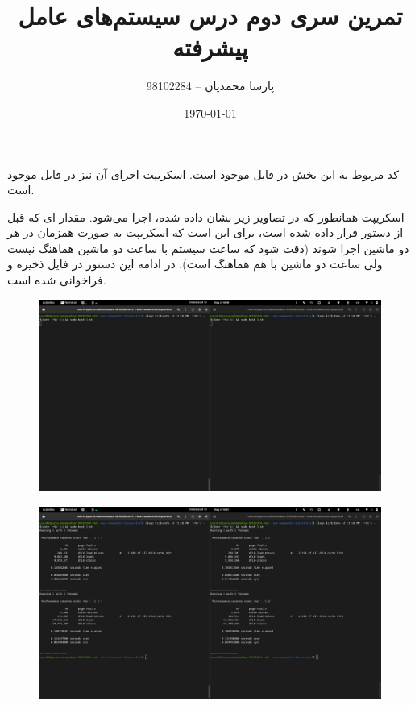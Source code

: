 \documentclass{article}
\title{تمرین سری دوم درس سیستم‌های عامل پیشرفته}
\author{پارسا محمدیان -- 98102284}
\date{\today}
\begin{document}
\maketitle

\section{}
کد مربوط به این بخش در فایل 
موجود است. اسکریپت اجرای آن نیز در فایل 
موجود است. 

اسکریپت همانطور که در تصاویر زیر نشان داده شده،‌ اجرا می‌شود. 
مقدار 
ای 
که قبل از دستور قرار داده شده است، برای این است که اسکریپت به صورت همزمان در هر دو ماشین 
اجرا شوند (دقت شود که ساعت سیستم با ساعت دو ماشین هماهنگ نیست ولی ساعت دو ماشین 
با هم هماهنگ است).
در ادامه این دستور 
در فایل 
ذخیره و فراخوانی شده است.

\begin{figure}[H]
   \centering
   \includegraphics[width=\linewidth]{1-command.png}
\end{figure}
\begin{figure}[H]
   \centering
   \includegraphics[width=\linewidth]{1-result.png}
\end{figure}
\end{document}
